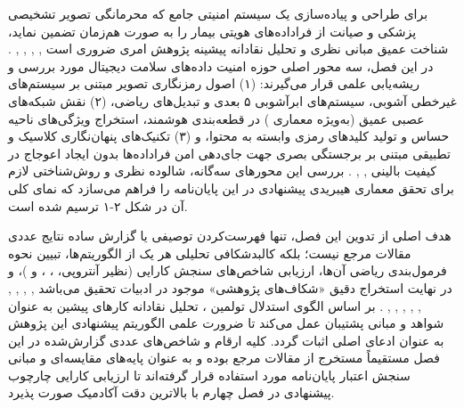 






برای طراحی و پیاده‌سازی یک سیستم امنیتی جامع که محرمانگی تصویر تشخیصی پزشکی و صیانت از فراداده‌های هویتی بیمار را به صورت هم‌زمان تضمین نماید، شناخت عمیق مبانی نظری و تحلیل نقادانه پیشینه پژوهش امری ضروری است , , , , . در این فصل، سه محور اصلی حوزه امنیت داده‌های سلامت دیجیتال مورد بررسی و ریشه‌یابی علمی قرار می‌گیرند: (۱) اصول رمزنگاری تصویر مبتنی بر سیستم‌های غیرخطی آشوبی، سیستم‌های ابرآشوبی ۵ بعدی و تبدیل‌های ریاضی، (۲) نقش شبکه‌های عصبی عمیق (به‌ویژه معماری ) در قطعه‌بندی هوشمند، استخراج ویژگی‌های ناحیه حساس  و تولید کلیدهای رمزی وابسته به محتوا، و (۳) تکنیک‌های پنهان‌نگاری کلاسیک و تطبیقی مبتنی بر برجستگی بصری  جهت جای‌دهی امن فراداده‌ها بدون ایجاد اعوجاج در کیفیت بالینی , , . بررسی این محورهای سه‌گانه، شالوده نظری و روش‌شناختی لازم برای تحقق معماری هیبریدی پیشنهادی در این پایان‌نامه را فراهم می‌سازد که نمای کلی آن در شکل ۲{-}۱ ترسیم شده است.\par






هدف اصلی از تدوین این فصل، تنها فهرست‌کردن توصیفی یا گزارش ساده نتایج عددی مقالات مرجع نیست؛ بلکه کالبدشکافی تحلیلی هر یک از الگوریتم‌ها، تبیین نحوه فرمول‌بندی ریاضی آن‌ها، ارزیابی شاخص‌های سنجش کارایی (نظیر آنتروپی، ، ،  و )، و در نهایت استخراج دقیق «شکاف‌های پژوهشی»  موجود در ادبیات تحقیق می‌باشد , , , , , , , , , . بر اساس الگوی استدلال تولمین ، تحلیل نقادانه کارهای پیشین به عنوان شواهد و مبانی پشتیبان  عمل می‌کند تا ضرورت علمی الگوریتم پیشنهادی این پژوهش به عنوان ادعای اصلی  اثبات گردد. کلیه ارقام و شاخص‌های عددی گزارش‌شده در این فصل مستقیماً مستخرج از مقالات مرجع بوده و به عنوان پایه‌های مقایسه‌ای و مبانی سنجش اعتبار پایان‌نامه مورد استفاده قرار گرفته‌اند تا ارزیابی کارایی چارچوب پیشنهادی در فصل چهارم با بالاترین دقت آکادمیک صورت پذیرد.\par

